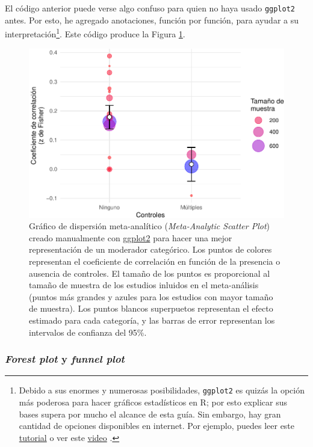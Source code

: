 \documentclass[
  bookmarksnumbered]{article}
\begin{document}
El código anterior puede verse algo confuso para quien no haya usado \texttt{ggplot2} antes. Por esto, he agregado anotaciones, función por función, para ayudar a su interpretación\footnote{Debido a sus enormes y numerosas posibilidades, \texttt{ggplot2} es quizás la opción más poderosa para hacer gráficos estadísticos en R; por esto explicar sus bases supera por mucho el alcance de esta guía. Sin embargo, hay gran cantidad de opciones disponibles en internet. Por ejemplo, puedes leer este \href{https://rpubs.com/anlope10/562981}{tutorial} \autocite{lopezpenarandaTutorialGgplot22019} o ver este \href{https://youtu.be/BUzTAr_QqKs}{video} \autocite{datademiaAprendeGgplot22018}.}. Este código produce la Figura \ref{fig:reg-plot3}.

\begin{figure}
\centering
\includegraphics{Meta-analysis_files/figure-latex/reg-plot3-1.pdf}
\caption{\label{fig:reg-plot3}Gráfico de dispersión meta-analítico (\emph{Meta-Analytic Scatter Plot}) creado manualmente con \href{https://ggplot2.tidyverse.org/}{ggplot2} para hacer una mejor representación de un moderador categórico. Los puntos de colores representan el coeficiente de correlación en función de la presencia o ausencia de controles. El tamaño de los puntos es proporcional al tamaño de muestra de los estudios inluidos en el meta-análisis (puntos más grandes y azules para los estudios con mayor tamaño de muestra). Los puntos blancos superpuetos representan el efecto estimado para cada categoría, y las barras de error representan los intervalos de confianza del 95\%.}
\end{figure}

\hypertarget{plot-mod2}{%
\subsubsection{\texorpdfstring{\emph{Forest plot} y \emph{funnel plot}}{Forest plot y funnel plot}}\label{plot-mod2}}
\end{document}
